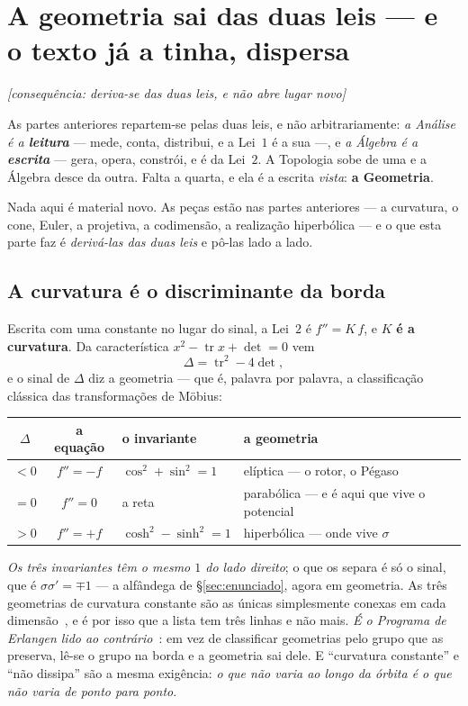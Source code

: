 \documentclass[livro.tex]{subfiles}
\begin{document}
\section{A geometria sai das duas leis --- e o texto já a tinha, dispersa}\label{sec:geo}
\hfill \emph{\small[consequência: deriva-se das duas leis, e não abre lugar novo]}

As partes anteriores repartem-se pelas duas leis, e não arbitrariamente: \emph{a Análise é a
\textbf{leitura}} --- mede, conta, distribui, e a Lei~$1$ é a sua ---, e \emph{a Álgebra é a
\textbf{escrita}} --- gera, opera, constrói, e é da Lei~$2$. A Topologia sobe de uma e a Álgebra
desce da outra. Falta a quarta, e ela é a escrita \emph{vista}: \textbf{a Geometria}.

\noindent Nada aqui é material novo. As peças estão nas partes anteriores --- a curvatura, o
cone, Euler, a projetiva, a codimensão, a realização hiperbólica --- e o que esta parte faz é
\emph{derivá-las das duas leis} e pô-las lado a lado.

\subsection{A curvatura é o discriminante da borda}\label{sec:geocurv}

Escrita com uma constante no lugar do sinal, a Lei~$2$ é $f''=K\,f$, e $K$ \textbf{é a curvatura}.
Da característica $x^{2}-\operatorname{tr}x+\det=0$ vem
\[
  \Delta = \operatorname{tr}^{2}-4\det ,
\]
e o sinal de $\Delta$ diz a geometria --- que é, palavra por palavra, a classificação clássica das
transformações de Möbius:

\begin{center}\small
\begin{tabular}{@{}ccll@{}}
\toprule
$\Delta$ & a equação & o invariante & a geometria \\
\midrule
$<0$ & $f''=-f$ & $\cos^{2}+\sin^{2}=1$   & elíptica --- o rotor, o Pégaso \\
$=0$ & $f''=0$  & a reta                  & parabólica --- e é aqui que vive o potencial \\
$>0$ & $f''=+f$ & $\cosh^{2}-\sinh^{2}=1$ & hiperbólica --- onde vive $\sigma$ \\
\bottomrule
\end{tabular}
\end{center}

\noindent \emph{Os três invariantes têm o mesmo $1$ do lado direito}; o que os separa é só o sinal,
que é $\sigma\sigma'=\mp1$ --- a alfândega de \S\ref{sec:enunciado}, agora em geometria. As três
geometrias de curvatura constante são as únicas simplesmente conexas em cada
dimensão~\cite{do-carmo}, e é por isso que a lista tem três linhas e não mais. \emph{É o
Programa de Erlangen lido ao contrário}~\cite{klein1872}: em vez de classificar geometrias pelo grupo
que as preserva, lê-se o grupo na borda e a geometria sai dele. E ``curvatura constante'' e ``não
dissipa'' são a mesma exigência: \emph{o que não varia ao longo da órbita é o que não varia de
ponto para ponto}.
\end{document}
